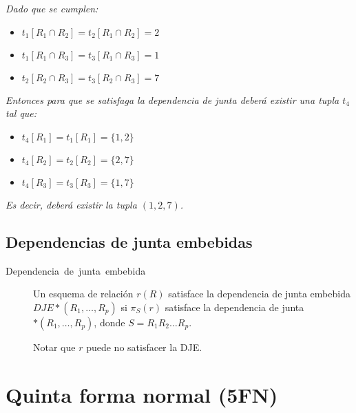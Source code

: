 \documentclass[a4paper, twoside]{article}
\begin{document}
\emph{Dado que se cumplen:}
\begin{itemize}
\item \emph{$t_{1}\left[R_{1}\cap R_{2}\right]=t_{2}\left[R_{1}\cap R_{2}\right]=2$}
\item \emph{$t_{1}\left[R_{1}\cap R_{3}\right]=t_{3}\left[R_{1}\cap R_{3}\right]=1$}
\item \emph{$t_{2}\left[R_{2}\cap R_{3}\right]=t_{3}\left[R_{2}\cap R_{3}\right]=7$}
\end{itemize}
\emph{Entonces para que se satisfaga la dependencia de junta deberá
existir una tupla $t_{4}$ tal que:}
\begin{itemize}
\item \emph{$t_{4}\left[R_{1}\right]=t_{1}\left[R_{1}\right]=\{1,2\}$}
\item \emph{$t_{4}\left[R_{2}\right]=t_{2}\left[R_{2}\right]=\{2,7\}$}
\item \emph{$t_{4}\left[R_{3}\right]=t_{3}\left[R_{3}\right]=\{1,7\}$}
\end{itemize}
\emph{Es decir, deberá existir la tupla $\left(1,2,7\right)$.}


\subsection{Dependencias de junta embebidas}
\begin{description}
\item [{Dependencia~de~junta~embebida}] Un esquema de relación $r(R)$
satisface la dependencia de junta embebida $DJE*\left(R_{1},\ldots,R_{p}\right)$
si $\pi_{S}(r)$ satisface la dependencia de junta $*\left(R_{1},\ldots,R_{p}\right)$,
donde $S=R_{1}R_{2}\ldots R_{p}$.


Notar que $r$ puede no satisfacer la DJE.

\end{description}

\section{Quinta forma normal (5FN)}
\end{document}
